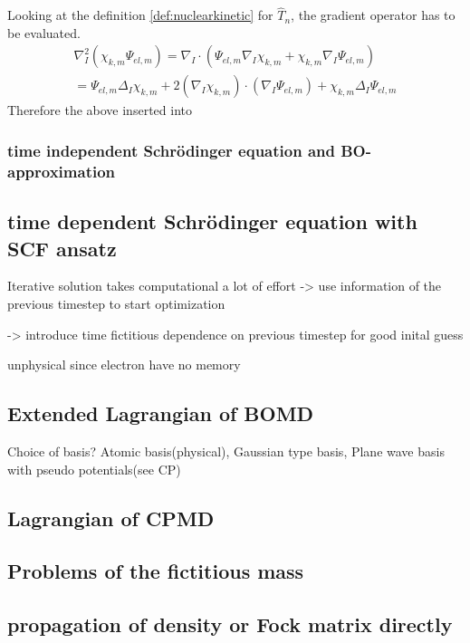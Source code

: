 \documentclass[12pt]{scrartcl}
\begin{document}
Looking at the definition \ref{def:nuclearkinetic} for $\hat{T}_n$, the gradient operator has to be evaluated.
\begin{align*}
\nabla_I^2(\chi_{k,m}\Psi_{el,m})=\nabla_I \cdot (\Psi_{el,m}\nabla_I\chi_{k,m}+\chi_{k,m}\nabla_I\Psi_{el,m}) \\
=\Psi_{el,m}\Delta_I\chi_{k,m}+2(\nabla_I\chi_{k,m})\cdot(\nabla_I\Psi_{el,m})+\chi_{k,m}\Delta_I\Psi_{el,m}
\end{align*}
Therefore the above inserted into






\subsubsection{time independent Schr\"odinger equation and BO-approximation}
\subsection{time dependent Schr\"odinger equation with SCF ansatz}

Iterative solution takes computational a lot of effort -> use information of the previous timestep to start optimization

-> introduce time fictitious dependence on previous timestep for good inital guess

unphysical since electron have no memory

\subsection{Extended Lagrangian of BOMD}

Choice of basis? Atomic basis(physical), Gaussian type basis, Plane wave basis with pseudo potentials(see CP)

\subsection{Lagrangian of CPMD}
\subsection{Problems of the fictitious mass}

\subsection{propagation of density or Fock matrix directly}
\end{document}
